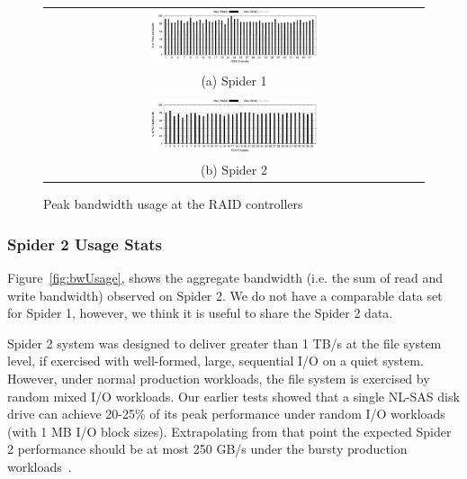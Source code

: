 \begin{figure}[!thb]
\begin{center}
\begin{tabular}{c}
{\includegraphics[width=0.450\textwidth]{./figs/spider1-bw-perc-max.eps}}\\
{(a) Spider 1}\\
\\
{\includegraphics[width=0.450\textwidth]{./figs/spider2-bw-perc-max.eps}}\\
{(b) Spider 2}\\
\end{tabular}
\vspace{-0.1in}
\caption{Peak bandwidth usage at the RAID controllers}
\label{fig:ddnpeakBW}
\end{center}
\end{figure}

\subsubsection{Spider 2 Usage Stats}

Figure~\ref{fig:bwUsage}, shows the aggregate bandwidth (i.e. the sum of read
and write bandwidth) observed on Spider 2. We do not have a comparable data set
for Spider 1, however, we think it is useful to share the Spider 2 data. 

Spider 2 system was designed to deliver greater than 1 TB/s at the file system level, 
if exercised with well-formed, large, sequential I/O on a quiet system. However, under
normal production workloads, the file system is exercised by random mixed I/O
workloads. Our earlier tests showed that a single NL-SAS disk drive can achieve
20-25\% of its peak performance under random I/O workloads (with 1 MB I/O block
sizes). Extrapolating from that point the expected Spider 2 performance should be 
at most 250 GB/s under the bursty production workloads~\cite{bestpractices}.


